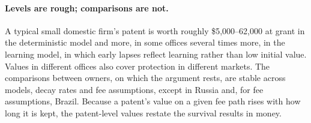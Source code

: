 \paragraph{Levels are rough; comparisons are not.} A typical small domestic firm's patent is worth roughly
\$5{,}000--62{,}000 at grant in the deterministic model and more, in some offices several times more, in the learning model, in which early
lapses reflect learning rather than low initial value. Values in different offices also cover protection in
different markets. The comparisons between owners, on which the argument rests, are stable across models, decay rates
and fee assumptions, except in Russia and, for fee assumptions, Brazil. Because a patent's value on a given fee path rises with how long it is kept,
the patent-level values restate the survival results in money.
